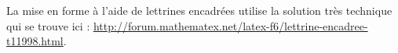 \documentclass[10pt,a4paper]{article}
\begin{document}
La mise en forme à l'aide de lettrines encadrées utilise la solution très technique qui se trouve ici : \hyperref[http://forum.mathematex.net/latex-f6/lettrine-encadree-t11998.html]{http://forum.mathematex.net/latex-f6/lettrine-encadree-t11998.html}.
\end{document}
